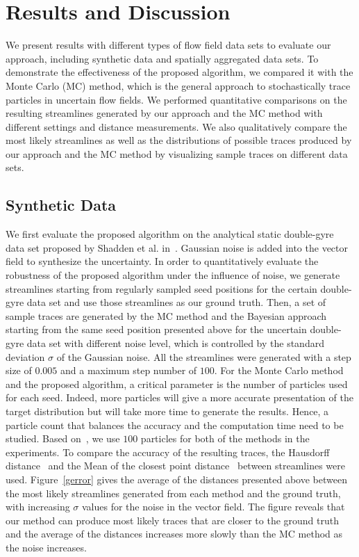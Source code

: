 \section{Results and Discussion}

We present results with different types of flow field data sets to evaluate our approach, including synthetic data and spatially aggregated data sets. To demonstrate the effectiveness of the proposed algorithm, we compared it with the Monte Carlo (MC) method, which is the general approach to stochastically trace particles in uncertain flow fields. We performed quantitative comparisons on the resulting streamlines generated by our approach and the MC method with different settings and distance measurements. We also qualitatively compare the most likely streamlines as well as the distributions of possible traces produced by our approach and the MC method by visualizing sample traces on different data sets.

\subsection{Synthetic Data}

We first evaluate the proposed algorithm on the analytical static double-gyre data set proposed by Shadden et al. in~\cite{Shadden2005271}. Gaussian noise is added into the vector field to synthesize the uncertainty. In order to quantitatively evaluate the robustness of the proposed algorithm under the influence of noise, we generate streamlines starting from regularly sampled seed positions for the certain double-gyre data set and use those streamlines as our ground truth. Then, a set of sample traces are generated by the MC method and the Bayesian approach starting from the same seed position presented above for the uncertain double-gyre data set with different noise level, which is controlled by the standard deviation $\sigma$ of the Gaussian noise. All the streamlines were generated with a step size of $0.005$ and a maximum step number of $100$. For the Monte Carlo method and the proposed algorithm, a critical parameter is the number of particles used for each seed. Indeed, more particles will give a more accurate presentation of the target distribution but will take more time to generate the results. Hence, a particle count that balances the accuracy and the computation time need to be studied. Based on~\cite{journals/mia/PontabryROSKD13}, we use $100$ particles for both of the methods in the experiments. To compare the accuracy of the resulting traces, the Hausdorff distance~\cite{Roessl:2012:TVCG} and the Mean of the closest point distance~\cite{Corouge04towardsa} between streamlines were used. Figure~\ref{gerror} gives the average of the distances presented above between the most likely streamlines generated from each method and the ground truth, with increasing $\sigma$ values for the noise in the vector field. The figure reveals that our method can produce most likely traces that are closer to the ground truth and the average of the distances increases more slowly than the MC method as the noise increases.

